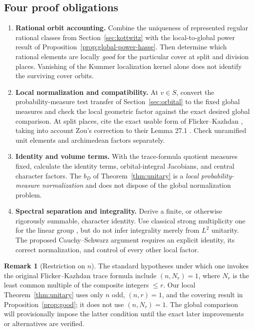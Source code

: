 \documentclass[11pt]{article}
\theoremstyle{plain}
\theoremstyle{definition}
\newtheorem{remark}[theorem]{Remark}
\begin{document}
\subsection{Four proof obligations}
\begin{enumerate}[label=(\arabic*)]
\item \textbf{Rational orbit accounting.} Combine the uniqueness of represented regular rational classes from
Section~\ref{sec:kottwitz} with the local-to-global power result
of Proposition~\ref{prop:global-power-hasse}. Then determine which
rational elements are locally \emph{good} for the particular
cover at split and division places. Vanishing of the Kummer
localization kernel alone does not identify the surviving cover orbits.
\item \textbf{Local normalization and compatibility.} At $v\in S$, convert the probability-measure test transfer of Section~\ref{sec:orbital} to the fixed global measures and check the local geometric factor against the exact desired global comparison. At split places, cite the exact usable form of Flicker--Kazhdan \cite{FK86}, taking into account Zou's correction to their Lemma 27.1 \cite{Zou}. Check unramified unit elements and archimedean factors separately.
\item \textbf{Identity and volume terms.} With the trace-formula quotient measures fixed, calculate the identity terms, orbital-integral Jacobians, and central character factors. The $b_D$ of Theorem~\ref{thm:unitary} is a \emph{local probability-measure normalization} and does not dispose of the global normalization problem.
\item \textbf{Spectral separation and integrality.} Derive a finite, or otherwise rigorously summable, character identity. Use classical strong multiplicity one for the linear group \cite{Badulescu}, but do not infer integrality merely from $L^2$ unitarity. The proposed Cauchy--Schwarz argument requires an explicit identity, its correct normalization, and control of every other local factor.
\end{enumerate}

\begin{remark}[Restriction on $n$]\label{rem:N}
The standard hypotheses under which one invokes the original Flicker--Kazhdan trace formula include $(n,N_r)=1$, where $N_r$ is the least common multiple of the composite integers $\le r$. Our local Theorem~\ref{thm:unitary} uses only $n$ odd, $(n,r)=1$, and the covering result in Proposition~\ref{prop:good}; it does not use $(n,N_r)=1$. The global comparison will provisionally impose the latter condition until the exact later improvements or alternatives are verified.
\end{remark}
\end{document}
